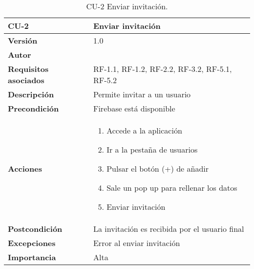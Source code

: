 \begin{table}[p]
	\centering
	\begin{tabularx}{\linewidth}{ p{} p{} }
		\toprule
		\textbf{CU-2}    & \textbf{Enviar invitación}\\
		\toprule
		\textbf{Versión}              & 1.0    \\
		\textbf{Autor}                & {\nombre} \\
		\textbf{Requisitos asociados} & RF-1.1, RF-1.2, RF-2.2, RF-3.2, RF-5.1, RF-5.2 \\
		\textbf{Descripción}          & Permite invitar a un usuario \\
		\textbf{Precondición}         & Firebase está disponible \\
		\textbf{Acciones}             &
		\begin{enumerate}
			\def\labelenumi{\arabic{enumi}.}
			\tightlist
			\item Accede a la aplicación
			\item Ir a la pestaña de usuarios
			\item Pulsar el botón (+) de añadir
			\item Sale un pop up para rellenar los datos
			\item Enviar invitación
		\end{enumerate}\\
		\textbf{Postcondición}        & La invitación es recibida por el usuario final \\
		\textbf{Excepciones}          & Error al enviar invitación \\
		\textbf{Importancia}          & Alta \\
		\bottomrule
	\end{tabularx}
	\caption{CU-2 Enviar invitación.}
\end{table}

